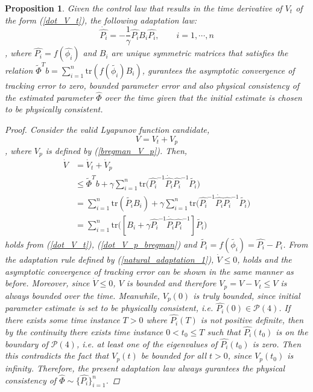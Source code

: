 \documentclass[letterpaper, 10 pt, conference]{ieeeconf}  %
\newtheorem{proposition}{Proposition}
\begin{document}
\begin{proposition}
Given the control law that results in the time derivative of $V_{t}$ of the form (\ref{dot_V_t}), the following adaptation law:
\begin{equation}  
\dot{\hat{P_i}} = -\frac{1}{\gamma}\hat{P_i} B_i \hat{P_i}, \qquad i = 1, \cdots, n \label{natural_adaptation_1}
\end{equation}
, where $\hat{P_i} = f(\hat{\phi_i})$ and $B_i$ are unique symmetric matrices that satisfies the relation $\tilde{\Phi}^{T}b = \sum_{i=1}^n \mathrm{tr}(f(\tilde{\phi_i})B_i)$, gurantees the asymptotic convergence of tracking error to zero, bounded parameter error and also physical consistency of the estimated parameter $\hat{\Phi}$ over the time given that the initial estimate is chosen to be physically consistent.

\begin{proof}
Consider the valid Lyapunov function candidate,
\begin{equation*}
V = V_t + V_p
\end{equation*}
, where $V_p$ is defined by (\ref{bregman_V_p}). Then,
\begin{align*}
\dot{V} &= \dot{V}_t + \dot{V}_p\\
&\leq \tilde{\Phi}^{T}b + \gamma\sum_{i=1}^n \mathrm{tr}\big(\hat{P_i}^{-1}\dot{\hat{P_i}}\hat{P_i}^{-1}\tilde{P_i}\big)\\
 &=\sum_{i=1}^n\mathrm{tr}(\tilde{P_i}B_i) + \gamma\sum_{i=1}^n \mathrm{tr}\big(\hat{P_i}^{-1}\dot{\hat{P_i}}\hat{P_i}^{-1}\tilde{P_i}\big)\\
 &= \sum_{i=1}^n \mathrm{tr}\big([B_i +\gamma\hat{P_i}^{-1}\dot{\hat{P_i}}\hat{P_i}^{-1}]\tilde{P_i}\big)
\end{align*}
holds from (\ref{dot_V_t}), (\ref{dot_V_p_bregman}) and $\tilde{P_i} = f(\tilde{\phi_i}) = \hat{P_i}-P_i$. From the adaptation rule defined by (\ref{natural_adaptation_1}), $\dot{V}\leq 0$,
holds and the asymptotic convergence of tracking error can be shown in the same manner as before. Moreover, since $\dot{V} \leq 0$, $V$ is bounded and therefore $V_p = V - V_t \leq V$ is always bounded over the time. Meanwhile, $V_p(0)$ is truly bounded, since initial parameter estimate is set to be physically consistent, i.e. $\hat{P_i}(0) \in \mathcal{P}(4)$. If there exists some time instance $T>0$ where $\hat{P_i}(T)$ is not positive definite, then by the continuity there exists time instance $0<t_0\leq T$ such that $\hat{P_i}(t_0)$ is on the boundary of $\mathcal{P}(4)$, i.e. at least one of the eigenvalues of $\hat{P_i}(t_0)$ is zero. Then this contradicts the fact that $V_p(t)$ be bounded for all $t>0$, since $V_p(t_0)$ is infinity. Therefore, the present adaptation law always gurantees the physical consistency of $\hat{\Phi} \sim \{\hat{P_i}\}_{i=1}^n$.
\end{proof}
\end{proposition}
\end{document}

